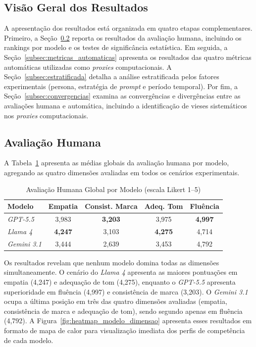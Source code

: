 \documentclass[12pt, a4paper]{article}
\numberwithin{equation}{section}
\begin{document}
\subsection{Visão Geral dos Resultados}

A apresentação dos resultados está organizada em quatro etapas complementares. Primeiro, a Seção~\ref{subsec:avaliacao_humana} reporta os resultados da avaliação humana, incluindo os rankings por modelo e os testes de significância estatística. Em seguida, a Seção~\ref{subsec:metricas_automaticas} apresenta os resultados das quatro métricas automáticas utilizadas como \textit{proxies} computacionais. A Seção~\ref{subsec:estratificada} detalha a análise estratificada pelos fatores experimentais (persona, estratégia de \textit{prompt} e período temporal). Por fim, a Seção~\ref{subsec:convergencias} examina as convergências e divergências entre as avaliações humana e automática, incluindo a identificação de vieses sistemáticos nos \textit{proxies} computacionais.

\subsection{Avaliação Humana}
\label{subsec:avaliacao_humana}

A Tabela~\ref{tab:human_global} apresenta as médias globais da avaliação humana por modelo, agregando as quatro dimensões avaliadas em todos os cenários experimentais.

\begin{table}[H]
\centering
\caption{Avaliação Humana Global por Modelo (escala Likert 1--5)}
\label{tab:human_global}
\begin{tabular}{@{}lcccc@{}}
\toprule
\textbf{Modelo} & \textbf{Empatia} & \textbf{Consist. Marca} & \textbf{Adeq. Tom} & \textbf{Fluência} \\ \midrule
\textit{GPT-5.5} & 3,983 & \textbf{3,203} & 3,975 & \textbf{4,997} \\
\textit{Llama 4} & \textbf{4,247} & 3,103 & \textbf{4,275} & 4,714 \\
\textit{Gemini 3.1} & 3,444 & 2,639 & 3,453 & 4,792 \\ \bottomrule
\end{tabular}
\end{table}

Os resultados revelam que nenhum modelo domina todas as dimensões simultaneamente. O cenário do \textit{Llama 4} apresenta as maiores pontuações em empatia (4,247) e adequação de tom (4,275), enquanto o \textit{GPT-5.5} apresenta superioridade em fluência (4,997) e consistência de marca (3,203). O \textit{Gemini 3.1} ocupa a última posição em três das quatro dimensões avaliadas (empatia, consistência de marca e adequação de tom), sendo segundo apenas em fluência (4,792). A Figura~\ref{fig:heatmap_modelo_dimensao} apresenta esses resultados em formato de mapa de calor para visualização imediata dos perfis de competência de cada modelo.
\end{document}

